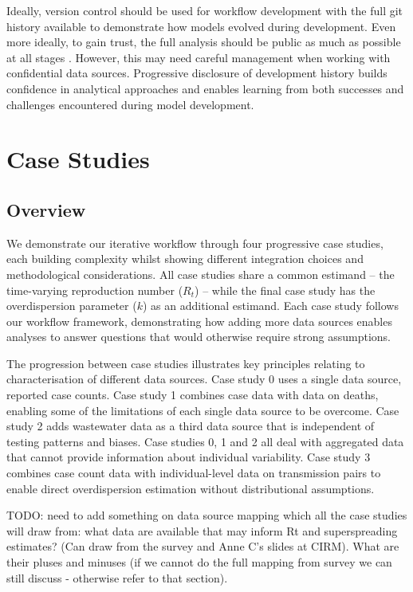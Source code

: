 \documentclass{article}
\begin{document}
Ideally, version control should be used for workflow development with the full git history available to demonstrate how models evolved during development.
Even more ideally, to gain trust, the full analysis should be public as much as possible at all stages \citep{Abbott2021-delta, Abbott2022-prevalence}.
However, this may need careful management when working with confidential data sources.
Progressive disclosure of development history builds confidence in analytical approaches and enables learning from both successes and challenges encountered during model development.

\section{Case Studies}

\subsection{Overview}

We demonstrate our iterative workflow through four progressive case studies, each building complexity whilst showing different integration choices and methodological considerations.
All case studies share a common estimand -- the time-varying reproduction number ($R_t$) -- while the final case study has the overdispersion parameter ($k$) as an additional estimand. 
Each case study follows our workflow framework, demonstrating how adding more data sources enables analyses to answer questions that would otherwise require strong assumptions.

The progression between case studies illustrates key principles relating to characterisation of different data sources. Case study 0 uses a single data source, reported case counts. Case study 1 combines case data with data on deaths, enabling some of the limitations of each single data source to be overcome. Case study 2 adds wastewater data as a third data source that is independent of testing patterns and biases. Case studies 0, 1 and 2 all deal with aggregated data that cannot provide information about individual variability. Case study 3 combines case count data with individual-level data on transmission pairs to enable direct overdispersion estimation without distributional assumptions.


TODO: need to add something on data source mapping which all the case studies will draw from: what data are available that may inform Rt and superspreading estimates? (Can draw from the survey and Anne C's slides at CIRM). What are their pluses and minuses (if we cannot do the full mapping from survey we can still discuss - otherwise refer to that section).
\end{document}
